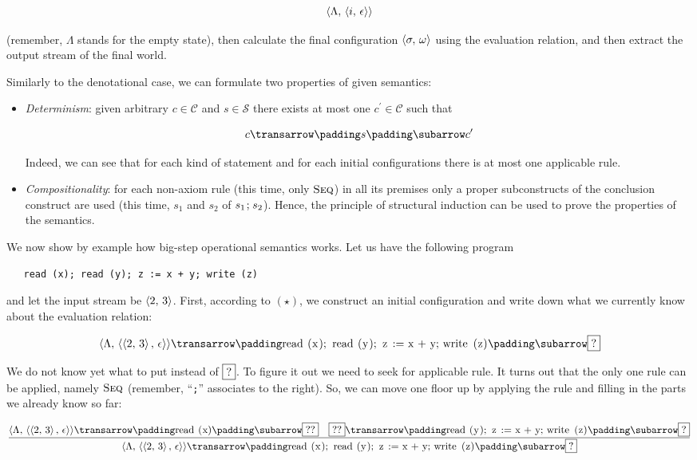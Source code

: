 \[
\left<{\Lambda,\,\left<{i,\,\epsilon}\right>}\right>
\]

(remember, $\Lambda$ stands for the empty state), then calculate the final configuration $\left<{\sigma,\,\omega}\right>$ using
the evaluation relation, and then extract the output stream of the final world.

Similarly to the denotational case, we can formulate two properties of given semantics:

\begin{itemize}
\item \emph{Determinism}: given arbitrary $c\in\mathscr{C}$ and $s\in\mathscr{S}$ there exists at most one $c^\prime\in\mathscr{C}$ such that

  \[
  \trans{c}{s}{c^\prime}
  \]

  Indeed, we can see that for each kind of statement and for each initial configurations there is at most one applicable rule.

\item \emph{Compositionality}: for each non-axiom rule (this time, only $\textsc{Seq}$) in all its premises only
  a proper subconstructs of the conclusion construct are used (this time, $s_1$ and $s_2$ of $s_1\llang{;}\,s_2$). Hence,
  the principle of structural induction can be used to prove the properties of the semantics.
\end{itemize}

We now show by example how big-step operational semantics works. Let us have the following program

\begin{lstlisting}
   read (x); read (y); z := x + y; write (z)
\end{lstlisting}

and let the input stream be $\left<{2,\,3}\right>$. First, according to $(\star)$, we construct an initial configuration
and write down what we currently know about the evaluation relation:

\[
\trans{\inbr{\Lambda,\,\inbr{\inbr{2,\,3},\,\epsilon}}}{\llang{read (x); read (y); z := x + y; write (z)}}{\fbox{?}}
\]

We do not know yet what to put instead of $\fbox{?}$. To figure it out we need to seek for applicable rule. It turns
out that the only one rule can be applied, namely $\textsc{Seq}$ (remember, ``\lstinline|;|'' associates to
the right). So, we can move one floor up by applying the rule and filling in the parts we already know
so far:

\[
\trule{\trans{\inbr{\Lambda,\,\inbr{\inbr{2,\,3},\,\epsilon}}}{\llang{read (x)}}{\fbox{??}}\quad\trans{\fbox{??}}{\llang{read (y); z := x + y; write (z)}}{\fbox{?}}}
      {\trans{\inbr{\Lambda,\,\inbr{\inbr{2,\,3},\,\epsilon}}}{\llang{read (x); read (y); z := x + y; write (z)}}{\fbox{?}}}
\]

